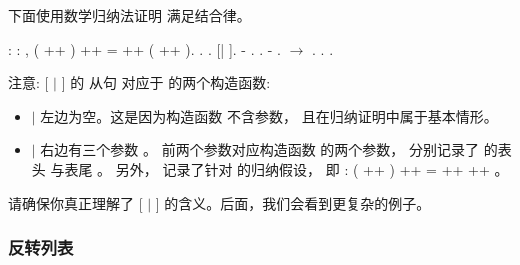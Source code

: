 \documentclass[12pt]{report}
\begin{document}
{{{  下面使用数学归纳法证明  满足结合律。
\begin{coqdoccode}
\coqdocnoindent
{}  : \coqdockw{\ensuremath{\forall}}    : ,\coqdoceol
\coqdocindent{1.00em}
( ++ ) ++  =  ++ ( ++ ).\coqdoceol
\coqdocnoindent
{}.\coqdoceol
\coqdocindent{1.00em}
   .\coqdoceol
\coqdocindent{1.00em}
   [|   ]. \coqdocindent{1.00em}
- \coqdoceol
\coqdocindent{2.00em}
. .\coqdoceol
\coqdocindent{1.00em}
- \coqdoceol
\coqdocindent{2.00em}
.  \ensuremath{\rightarrow} . .\coqdoceol
\coqdocnoindent
{}.\coqdoceol
\coqdocemptyline
\end{coqdoccode}
  注意:    [ \ensuremath{|}   ] 的  从句
  对应于  的两个构造函数:

\begin{itemize}
\item   \ensuremath{|}  左边为空。这是因为构造函数  不含参数，
    且在归纳证明中属于基本情形。

\item   \ensuremath{|}  右边有三个参数   。
    前两个参数对应构造函数  的两个参数，
    分别记录了  的表头  与表尾 。
    另外， 记录了针对  的归纳假设，
    即 : ( ++ ) ++  =  ++  ++ 。

\end{itemize}


  请确保你真正理解了    [ \ensuremath{|}   ] 
  的含义。后面，我们会看到更复杂的例子。
\begin{coqdoccode}
\end{coqdoccode}
\subsubsection{反转列表}



}}}
\end{document}
